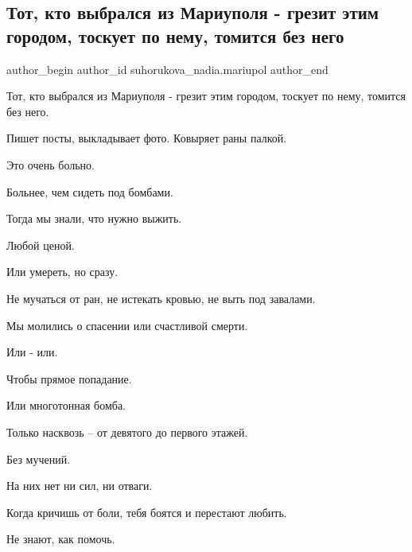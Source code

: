  
 
 
 
 

\subsection{Тот, кто выбрался из Мариуполя - грезит этим городом, тоскует по нему,  томится без него}
\label{sec:09_02_2023.fb.suhorukova_nadia.mariupol.1.tot__kto_vibralsya_i}

\ifcmt
 author_begin
   author_id suhorukova_nadia.mariupol
 author_end
\fi

Тот, кто выбрался из Мариуполя -  грезит этим городом, тоскует по нему,
томится без него.  

Пишет посты, выкладывает фото.  Ковыряет раны палкой. 

Это очень больно. 

Больнее, чем сидеть под бомбами. 

Тогда мы знали, что нужно выжить. 

Любой ценой.

Или умереть, но сразу. 

Не мучаться от ран, не истекать кровью, не выть  под завалами. 

Мы молились о спасении или счастливой смерти.

Или -  или.

Чтобы прямое попадание. 

Или многотонная бомба. 

Только  насквозь – от девятого до первого этажей. 

Без мучений. 

На них  нет ни сил, ни отваги. 

Когда кричишь от боли, тебя боятся и перестают любить.

Не знают, как помочь. 

